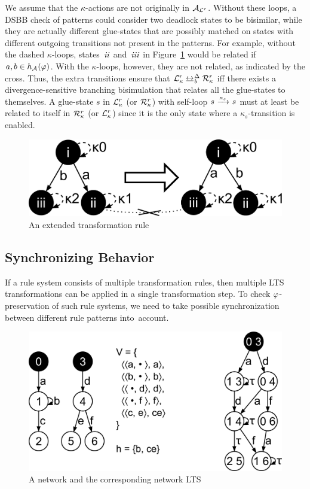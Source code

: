 \noindent
We assume that the $\kappa$-actions are not originally in ${\mathcal{A}_{\mathcal{L}^r}}$.
Without these loops, a DSBB check of patterns could consider two deadlock states to be bisimilar, while they are actually different glue-states that are possibly matched on states with different outgoing transitions not present in the patterns.
For example, without the dashed $\kappa$-loops, states~$\it{ii}$ and~$\it{iii}$ in Figure~\ref{fig:lts-transformation:kappa} would be related if~$a,b \in h_{{\mathcal{A}_{}}}(\varphi)$.
With the $\kappa$-loops, however, they are not related, as indicated by the cross.
Thus, the extra transitions ensure that $\Llts^r_\kappa \dsbbis \Rlts^r_\kappa$ iff there exists a divergence-sensitive branching bisimulation that relates all the glue-states to themselves.
A glue-state $s$ in $\mathcal{L}^r_\kappa$ (or $\mathcal{R}^r_\kappa$) with self-loop $s\ \smash{\xrightarrow{\kappa_s}}\ s$ must at least be related to itself in $\mathcal{R}^r_\kappa$ (or $\mathcal{L}^r_\kappa$) since it is the only state where a $\kappa_s$-transition is enabled.

\begin{figure}[hbt]
\centering
\includegraphics[scale=0.2]{lts-transformation/figs/kappa-loops}
\caption{An extended transformation rule}
\label{fig:lts-transformation:kappa}
\end{figure}

\subsection{Synchronizing Behavior}
If a rule system consists of multiple transformation rules, then multiple LTS transformations can be applied in a single transformation step.
To check $\varphi$-preservation of such rule systems, we need to take possible synchronization between different rule patterns into~account.

\begin{figure}[hbt]
\centering
\includegraphics[scale=0.2]{lts-transformation/figs/comparison-network}
\caption{A network and the corresponding network LTS}
\label{fig:lts-transformation:comparison-network}
\end{figure}


